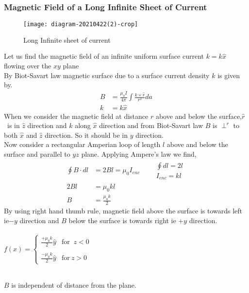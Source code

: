 \subsubsection{Magnetic Field of a Long Infinite Sheet of Current}
\begin{wrapfigure}{r}{0.30\textwidth}
	\begin{center}
		\texttt{[image: diagram-20210422(2)-crop]}
	\end{center}
	\caption{Long Infinite sheet of current}
\end{wrapfigure}
Let us find the magnetic field of an infinite uniform surface current $k=k\hat{x}$ flowing over the $xy$ plane\\
By Biot-Savart law magnetic surface due to a surface current density $k$ is given by.
	\begin{align*}
	B&=\frac{\mu_0 I}{4\pi}\int\frac{k\times \hat{r}}{r^2}da\\
	k&=k\hat{x} 
	\end{align*}
When we consider the magnetic field at distance $r$ above and below the surface,$\hat{r}$\ is in $\hat{z}$ direction and $k$ along $\hat{x}$ direction and from Biot-Savart law $B$ is $\perp^r$ to both $\hat{x}$ and $\hat{z}$ direction. So it should be in $y$ direction.\\
Now consider a rectangular Amperian loop of length $l$ above and below the surface and parallel to $yz$ plane. Applying Ampere's law we find,
\begin{align*}
\oint B \cdot dl&=2Bl=\mu_0 I_{enc} \qquad\begin{array}{l}
\oint dl=2l \\
I{_{enc}=kl}
\end{array}\\
2Bl&=\mu_0kl\\
B&=\frac{\mu_0k}{2}
\end{align*}
By using right hand thumb rule, magnetic field above the surface is towards left ie$-y$ direction and $B$ below the surface is towards right ie $+y$ direction.\\\\
$f(x)= 
\begin{cases}
\frac{+\mu_0 k}{2}\hat{y}& \text{for }\ z<0\\\\
 \frac{-\mu_0 k}{2}\hat{y} & \text{for}\ z>0
\end{cases}$
\begin{note}\\
	$B$ is independent of distance from the plane.
\end{note}
